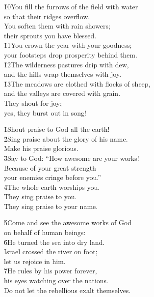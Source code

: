 \begin{poetry}
\poeml \v{10}You fill the furrows of the field with water \\
\poemll    so that their ridges overflow. \\
\poeml You soften them with rain showers; \\
\poemll    their sprouts you have blessed. \\
\poeml \v{11}You crown the year with your goodness; \\
\poemll    your footsteps drop prosperity behind them. \\
\poeml \v{12}The wilderness pastures drip with dew, \\
\poemll    and the hills wrap themselves with joy. \\
\poeml \v{13}The meadows are clothed with flocks of sheep, \\
\poemll    and the valleys are covered with grain. \\
\poeml They shout for joy; \\
\poemll    yes, they burst out in song!
\end{poetry}

\begin{poetry}
\poeml \v{1}Shout praise to God all the earth! \\
\poeml \v{2}Sing praise about the glory of his name. \\
\poemll    Make his praise glorious. \\
\poeml \v{3}Say to God: ``How awesome are your works! \\
\poemll    Because of your great strength \\
\poemlll       your enemies cringe before you.'' \\
\poeml \v{4}The whole earth worships you. \\
\poemll    They sing praise to you. \\
\poemlll       They sing praise to your name.
\end{poetry}

\begin{poetry}
\poeml \v{5}Come and see the awesome works of God \\
\poemll    on behalf of human beings: \\
\poeml \v{6}He turned the sea into dry land. \\
\poemll    Israel crossed the river on foot; \\
\poemlll       let us rejoice in him. \\
\poeml \v{7}He rules by his power forever, \\
\poemll    his eyes watching over the nations. \\
\poemlll       Do not let the rebellious exalt themselves.
\end{poetry}

